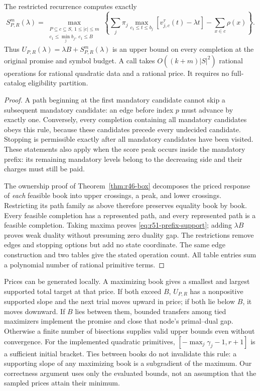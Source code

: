\begin{theorem}\label{thm:r51-prefix-price}
The restricted recurrence computes exactly
\begin{equation}\label{eq:r51-prefix-support}
 S_{P,R}^{m}(\lambda)=
 \max_{\substack{P\subseteq c\subseteq S,\ 1\leq|c|\leq m\\
 c_1\leq\min_jb_j,\ c_1\leq B}}
 \left\{\sum_j\pi_j\max_{c_1\leq t\leq b_j}
 [v_{j,c}^{\tau}(t)-\lambda t]-\sum_{x\in c}\rho(x)\right\}.
\end{equation}
Thus $U_{P,R}(\lambda)=\lambda B+S_{P,R}^{m}(\lambda)$ is an upper bound on every completion at the original promise and symbol budget. A call takes $O((k+m)|S|^2)$ rational operations for rational quadratic data and a rational price. It requires no full-catalog eligibility partition.
\end{theorem}
\begin{proof}
A path beginning at the first mandatory candidate cannot skip a subsequent mandatory candidate: an edge before index $p$ must advance by exactly one. Conversely, every completion containing all mandatory candidates obeys this rule, because these candidates precede every undecided candidate. Stopping is permissible exactly after all mandatory candidates have been visited. These statements also apply when the score peak occurs inside the mandatory prefix: its remaining mandatory levels belong to the decreasing side and their charges must still be paid.

The ownership proof of Theorem~\ref{thm:r46-box} decomposes the priced response of \emph{each} feasible book into upper crossings, a peak, and lower crossings. Restricting its path family as above therefore preserves equality book by book. Every feasible completion has a represented path, and every represented path is a feasible completion. Taking maxima proves \eqref{eq:r51-prefix-support}; adding $\lambda B$ proves weak duality without presuming zero duality gap. The restrictions remove edges and stopping options but add no state coordinate. The same edge construction and two tables give the stated operation count. All table entries sum a polynomial number of rational primitive terms.
\end{proof}

Prices can be generated locally. A maximizing book gives a smallest and largest supported total target at that price. If both exceed $B$, $U_{P,R}$ has a nonpositive supported slope and the next trial moves upward in price; if both lie below $B$, it moves downward. If $B$ lies between them, bounded transfers among tied maximizers implement the promise and close that node's primal--dual gap. Otherwise a finite number of bisections supplies valid upper bounds even without convergence. For the implemented quadratic primitives, $[-\max_j\gamma_j-1,r+1]$ is a sufficient initial bracket. Ties between books do not invalidate this rule: a supporting slope of any maximizing book is a subgradient of the maximum. Our correctness argument uses only the evaluated bounds, not an assumption that the sampled prices attain their minimum.

